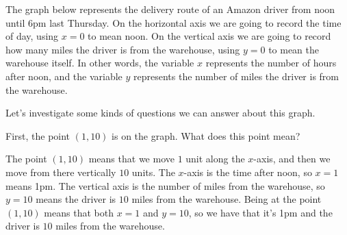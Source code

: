 \documentclass{ximera}
\begin{document}
\begin{example}
The graph below represents the delivery route of an Amazon driver from noon until 6pm last Thursday. On the horizontal axis we are going to record the time of day, using $x=0$ to mean noon. On the vertical axis we are going to record how many miles the driver is from the warehouse, using $y=0$ to mean the warehouse itself. In other words, the variable $x$ represents the number of hours after noon, and the variable $y$ represents the number of miles the driver is from the warehouse.
\begin{image}
\end{image}
Let's investigate some kinds of questions we can answer about this graph.

First, the point $(1,10)$ is on the graph. What does this point mean?
\begin{multipleChoice}
\begin{feedback}[correct]
The point $(1,10)$ means that we move $1$ unit along the $x$-axis, and then we move from there vertically $10$ units. The $x$-axis is the time after noon, so $x=1$ means 1pm. The vertical axis is the number of miles from the warehouse, so $y=10$ means the driver is $10$ miles from the warehouse. Being at the point $(1,10)$ means that both $x=1$ and $y=10$, so we have that it's 1pm and the driver is $10$ miles from the warehouse.
\end{feedback}
\end{multipleChoice}


\end{example}
\end{document}
